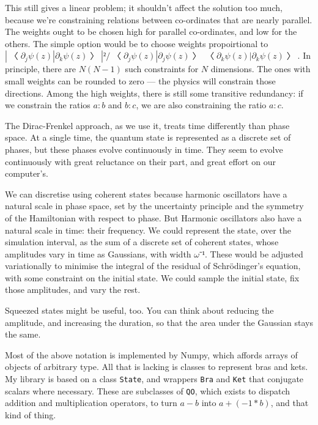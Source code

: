 This still gives a linear problem; it shouldn't affect the solution too much, because we're constraining relations between co-ordinates that are nearly parallel.  The weights ought to be chosen high for parallel co-ordinates, and low for the others.  The simple option would be to choose weights propoirtional to $|〈∂_jψ(z)|∂_kψ(z)〉|²/〈∂_jψ(z)|∂_jψ(z)〉〈∂_kψ(z)|∂_kψ(z)〉$.  In principle, there are $N(N-1)$ such constraints for $N$ dimensions.  The ones with small weights can be rounded to zero --- the physics will constrain those directions.  Among the high weights, there is still some transitive redundancy: if we constrain the ratios $a:b$ and $b:c$, we are also constraining the ratio $a:c$.


The Dirac-Frenkel approach, as we use it, treats time differently than phase space.  At a single time, the quantum state is represented as a discrete set of phases, but these phases evolve continuously in time.  They seem to evolve continuously with great reluctance on their part, and great effort on our computer's.

We can discretise using coherent states because harmonic oscillators have a natural scale in phase space, set by the uncertainty principle and the symmetry of the Hamiltonian with respect to phase.  But Harmonic oscillators also have a natural scale in time: their frequency.  We could represent the state, over the simulation interval, as the sum of a discrete set of coherent states, whose amplitudes vary in time as Gaussians, with width $ω⁻¹$.  These would be adjusted variationally to minimise the integral of the residual of Schrödinger's equation, with some constraint on the initial state.  We could sample the initial state, fix those amplitudes, and vary the rest.

Squeezed states might be useful, too.  You can think about reducing the amplitude, and increasing the duration, so that the area under the Gaussian stays the same.


Most of the above notation is implemented by Numpy, which affords arrays of objects of arbitrary type.  All that is lacking is classes to represent bras and kets.  My library is based on a class {\tt State}, and wrappers {\tt Bra} and {\tt Ket} that conjugate scalars where necessary.  These are subclasses of {\tt QO}, which exists to dispatch addition and multiplication operators, to turn $a-b$ into $a+(-1*b)$, and that kind of thing.

